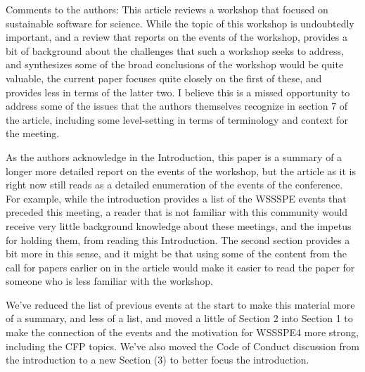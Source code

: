 \documentclass[11pt]{article}
\begin{document}
\begin{quoting}
Comments to the authors: 
This article reviews a workshop that focused on sustainable software for science. While the topic of this workshop is undoubtedly important, and a review that reports on the events of the workshop, provides a bit of background about the challenges that such a workshop seeks to address, and synthesizes some of the broad conclusions of the workshop would be quite valuable, the current paper focuses quite closely on the first of these, and provides less in terms of the latter two. I believe this is a missed opportunity to address some of the issues that the authors themselves recognize in section 7 of the article, including some level-setting in terms of terminology and context for the meeting.

As the authors acknowledge in the Introduction, this paper is a summary of a longer more detailed report on the events of the workshop, but the article as it is right now still reads as a detailed enumeration of the events of the conference. For example, while the introduction provides a list of the WSSSPE events that preceded this meeting, a reader that is not familiar with this community would receive very little background knowledge about these meetings, and the impetus for holding them, from reading this Introduction. The second section provides a bit more in this sense, and it might be that using some of the content from the call for papers earlier on in the article would make it easier to read the paper for someone who is less familiar with the workshop.

\end{quoting}
We've reduced the list of previous events at the start to make this material more of a summary, and less of a list, and moved a little of Section 2 into Section 1 to make the connection of the events and the motivation for WSSSPE4 more strong, including the CFP topics.  We've also moved the Code of Conduct discussion from the introduction to a new Section (3) to better focus the introduction.
\end{document}
